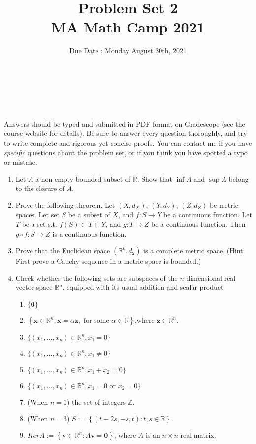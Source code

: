 \documentclass[11pt,letterpaper]{scrartcl}
\title{Problem Set 2 \\ MA Math Camp 2021 }
\author{ Due Date : Monday August 30th, 2021 }
\date{  }
\makeatletter
\newcommand{\reals}{\mathbb{R}}
\let\thetitle\@title
\let\theauthor\@author
\let\thedate\@date
\newcommand\makesimpletitle{%
\noindent 
\textbf{\large \thetitle} \\
\-\ \hspace{.2cm} { \large \theauthor } \\ 
\-\ \hspace{.2cm} { \normalsize \thedate }
}
\makeatother
\begin{document}


\makesimpletitle

Answers should be typed and submitted in PDF format on Gradescope (see the course website for details). Be sure to answer every question thoroughly, and try to write complete and rigorous yet concise proofs. You can contact me if you have \emph{specific} questions about the problem set, or if you think you have spotted a typo or mistake.

\vspace{.5cm}

\begin{enumerate}
	
	\item Let $A$ a non-empty bounded subset of $\reals$. Show that $\inf A$ and $\sup A$ belong to the closure of $A$.

	\item Prove the following theorem. Let $\left(X,d_{X}\right)$, $\left(Y,d_{Y}\right)$, $\left(Z,d_{Z}\right)$ be metric spaces. Let set $S$ be a subset of $X$, and $f:S\to Y$ be a continuous function. Let $T$ be a set s.t. $f\left(S\right)\subset T\subset Y$, and $g:T\to Z$ be a continuous function. Then $g\circ f:S\to Z$ is a continuous function.

	\item Prove that the Euclidean space $\left(\mathbb{R}^{k},d_{2}\right)$ is a complete metric space. (Hint: First prove a Cauchy sequence in a metric space is bounded.)

	\item Check whether the following sets are subspaces of the $n$-dimensional real vector space $\mathbb{R}^{n}$, equipped with its usual addition and scalar product.
		\begin{enumerate}
		\item $\{\mathbf{0}\}$
		\item $\left\{ \mathbf{x} \in\mathbb{R}^{n}, \mathbf{x}=\alpha\mathbf{z},\text{ for some }\alpha\in\mathbb{R}\right\} $,where $\mathbf{z}\in\mathbb{R}^{n}$.
		\item $\{ (x_1,...,x_n) \in \reals^n, x_1 = 0 \}$
		\item $\{ (x_1,...,x_n) \in \reals^n, x_1 \neq 0 \}$
		\item $\{ (x_1,...,x_n) \in \reals^n, x_1 + x_2 = 0 \}$
		\item $\{ (x_1,...,x_n) \in \reals^n, x_1 = 0 \text{ or } x_2 = 0 \}$
		\item (When $n=1$) the set of integers $\mathbb{Z}$.
		\item (When $n=3$) $S:=\left\{ \left(t-2s,-s,t\right):t,s\in\mathbb{R}\right\} $.
		\item $KerA:=\left\{ \mathbf{v}\in\mathbb{R}^{n}:A\mathbf{v}=\mathbf{0}\right\} $,
		where $A$ is an $n\times n$ real matrix.
		\end{enumerate}


\end{enumerate}
\end{document}
